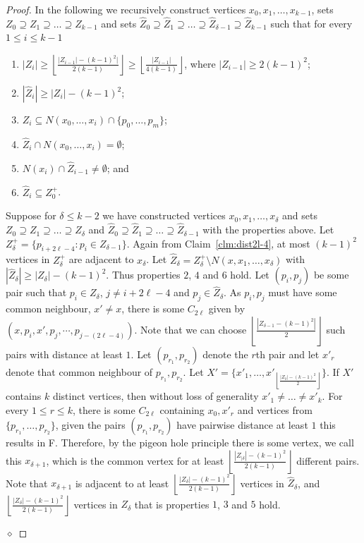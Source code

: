 \documentclass[10pt,a4paper]{amsart}
\newenvironment{claimproof}
{\noindent {\em Proof of Claim:} }
{\hfill $\diamond$ \smallskip}
\newcommand{\forbiddenGraph}{F}
\begin{document}
\begin{proof}
\begin{claimproof}
         In the following we recursively construct vertices $x_0, x_1,\ldots,x_{k-1}$, sets $Z_{0} \supseteq Z_1 \supseteq \ldots \supseteq Z_{k-1}$ and sets $\hat{Z}_{0} \supseteq \hat{Z}_{1} \supseteq \ldots \supseteq \hat{Z}_{\delta-1} \supseteq \hat{Z}_{k-1}$ such that for every $1\leq i \leq k-1$
         \begin{enumerate}
             \item $|Z_i|\geq \left\lfloor {\frac{|Z_{i-1}|- (k-1)^2|}{2(k-1)}} \right\rfloor \geq \left\lfloor {\frac{|Z_{i-1}|}{4(k-1)}} \right\rfloor$, where $|Z_{i-1}| \geq 2(k-1)^2$;
             \item $|\hat{Z}_i|\geq |Z_i|-(k-1)^2$;
             \item $Z_i\subseteq N(x_0, \dots, x_i)\cap \{p_0,\dots, p_m\}$;
             \item $\hat{Z}_i\cap N(x_0,\dots, x_{i})=\emptyset$;
             \item $N(x_i)\cap \hat{Z}_{i-1}\neq \emptyset$; and 
             \item $\hat{Z}_i\subseteq Z_0^+$.
         \end{enumerate} 
        
        Suppose for $\delta \leq k-2$ we have constructed vertices $x_0,x_1,\ldots,x_{\delta}$ and sets $Z_{0} \supseteq Z_1 \supseteq  \ldots \supseteq Z_{\delta}$ and $\hat{Z}_0 \supseteq \hat{Z}_1 \supseteq \ldots \supseteq \hat{Z}_{\delta-1}$ with the properties above. Let $Z^+_{\delta} = \{ p_{i+2\ell-4}: p_i \in Z_{\delta-1}\}$. Again from Claim~\ref{clm:dist2l-4}, at most $(k-1)^2$ vertices in $Z^+_{\delta}$ are adjacent to $x_{\delta}$. Let $\hat{Z}_{\delta} =Z^+_{\delta} \setminus N(x,x_1, \ldots, x_{\delta})$ with $|\hat{Z}_{\delta}| \geq |Z_{\delta}| -(k-1)^2$. Thus properties $2$, $4$ and $6$ hold.
        Let $(p_i,p_j)$ be some pair such that $p_i \in Z_{\delta}$, $j\not=i+2\ell-4$ and $p_j \in \hat{Z}_{\delta}$. As $p_i,p_j$ must have some common neighbour, $x' \neq x$, there is some $C_{2\ell}$ given by $(x,p_i, x', p_j, \cdots, p_{j-(2\ell-4)})$. Note that we can choose  $\left\lfloor {\frac{|Z_{\delta-1}- (k-1)^2|}{2}} \right\rfloor$ such pairs with distance at least $1$.
        Let $(p_{r_1},p_{r_2})$ denote the $r$th pair and let $x'_r$ denote that common neighbour of $p_{r_1},p_{r_2}$. Let $X' = \{x'_1,\dots, x'_{\left\lfloor {\frac{|Z_{\delta}|- (k-1)^2}{2}} \right\rfloor}\}$. If $X'$ contains $k$ distinct vertices, then without loss of generality $x'_1 \neq \ldots \neq x'_k$. For every $1 \leq r \leq k$, there is some $C_{2\ell}$ containing $x_0, x'_r$ and vertices from $\{p_{r_1}, \ldots, p_{r_2}\}$, given the pairs $(p_{r_1},p_{r_2})$ have pairwise distance at least $1$ this results in \forbiddenGraph. Therefore, by the pigeon hole principle there is some vertex, we call this $x_{\delta+1}$, which is the common vertex for at least $\left\lfloor {\frac{|Z_{|\delta}|- (k-1)^2}{2(k-1)}} \right\rfloor$ different pairs. Note that $x_{\delta+1}$ is adjacent to at least $\left\lfloor {\frac{|Z_{\delta}|- (k-1)^2}{2(k-1)}} \right\rfloor$ vertices in $\hat{Z}_{\delta}$, and $\left\lfloor {\frac{|Z_{\delta}|- (k-1)^2}{2(k-1)}} \right\rfloor$ vertices in $Z_{\delta}$ that is properties $1$, $3$ and $5$ hold.


\end{claimproof}
\end{proof}
\end{document}

